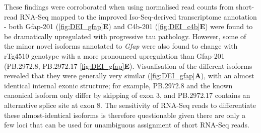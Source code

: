 These findings were corroborated when using normalised read counts from short-read RNA-Seq mapped to the improved Iso-Seq-derived transcriptome annotation - both Gfap-201 (\cref{fig:DEI_gfap}\textbf{E}) and C4b-201 (\cref{fig:DEI_c4b}\textbf{E}) were found to be dramatically upregulated with progressive tau pathology. However, some of the minor novel isoforms annotated to \textit{Gfap} were also found to change with rTg4510 genotype with a more pronounced upregulation than Gfap-201 (PB.2972.8, PB.2972.17 \cref{fig:DEI_gfap}\textbf{E}). Visualisation of the different isoforms revealed that they were generally very similar (\cref{fig:DEI_gfap}\textbf{A}), with an almost identical internal exonic structure; for example, PB.2972.8 and the known canonical isoform only differ by skipping of exon 3, and PB.2972.17 contains an alternative splice site at exon 8. The sensitivity of RNA-Seq reads to differentiate these almost-identical isoforms is therefore questionable given there are only a few loci that can be used for unambiguous assignment of short RNA-Seq reads.  

